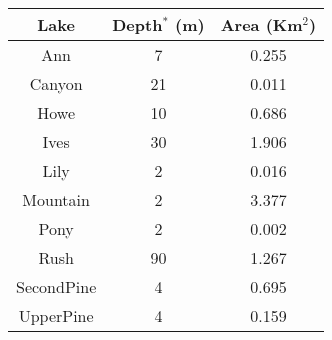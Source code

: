 \begin{table}[ht]
\centering
\begin{tabular}{ccc}
  \hline
\hline
  Lake & Depth$^*$ (m) & Area (Km$^2$) \\
 \hline
Ann &  7 & 0.255 \\ 
  Canyon & 21 & 0.011 \\ 
  Howe & 10 & 0.686 \\ 
  Ives & 30 & 1.906 \\ 
  Lily &  2 & 0.016 \\ 
  Mountain &  2 & 3.377 \\ 
  Pony &  2 & 0.002 \\ 
  Rush & 90 & 1.267 \\ 
  SecondPine &  4 & 0.695 \\ 
  UpperPine &  4 & 0.159 \\ 
   \hline
\end{tabular}
\end{table}
